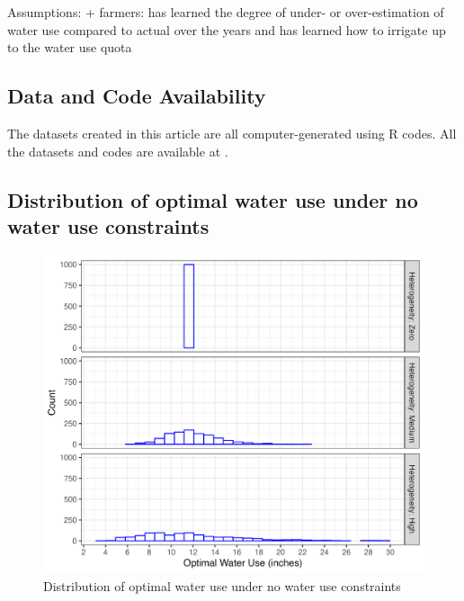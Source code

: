 \documentclass[
]{article}
\begin{document}
Assumptions:
+ farmers: has learned the degree of under- or over-estimation of water use compared to actual over the years and has learned how to irrigate up to the water use quota

\hypertarget{data-and-code-availability}{%
\subsection{Data and Code Availability}\label{data-and-code-availability}}

The datasets created in this article are all computer-generated using R codes. All the datasets and codes are available at .

\clearpage

\hypertarget{appendix-appendix}{%
\appendix}


\hypertarget{distribution-of-optimal-water-use-under-no-water-use-constraints}{%
\subsection{Distribution of optimal water use under no water use constraints}\label{distribution-of-optimal-water-use-under-no-water-use-constraints}}

\begin{figure}[H]

{\centering \includegraphics{figures/g_opt_w_dist} 

}

\caption{Distribution of optimal water use under no water use constraints}\label{fig:dist-opt-w}
\end{figure}

  
\end{document}
